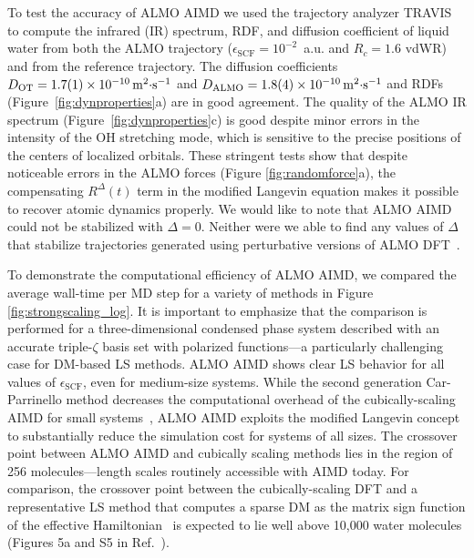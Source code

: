 \documentclass[aip,jcp,reprint,amsmath,amssymb]{revtex4-1}
\begin{document}
To test the accuracy of ALMO AIMD we used the trajectory analyzer TRAVIS~\cite{a:travis-main} to compute the infrared (IR) spectrum, RDF, and diffusion coefficient of liquid water from both the ALMO trajectory ($\epsilon_{\text{SCF}} = 10^{-2}$~a.u. and $R_{c} = 1.6$ vdWR) and from the reference trajectory. 
The diffusion coefficients $D_{\text{OT}}=\SI{1.7\pm0.1E-10}{\m^{2}\cdot\s^{-1}}$ and $D_{\text{ALMO}}=\SI{1.8\pm0.4E-10}{\m^{2}\cdot\s^{-1}}$ and RDFs (Figure~\ref{fig:dynproperties}a) are in good agreement. The quality of the ALMO IR spectrum (Figure~\ref{fig:dynproperties}c) is good despite minor errors in the intensity of the OH stretching mode, which is sensitive to the precise positions of the centers of localized orbitals. These stringent tests show that despite noticeable errors in the ALMO forces (Figure \ref{fig:randomforce}a), the compensating $R^{\Delta}(t)$ term in the modified Langevin equation makes it possible to recover atomic dynamics properly. We would like to note that ALMO AIMD could not be stabilized with $\Delta=0$. Neither were we able to find any values of $\Delta$ that stabilize trajectories generated using perturbative versions of ALMO DFT~\cite{a:almo-ls}.



To demonstrate the computational efficiency of ALMO AIMD, we compared the average wall-time per MD step for a variety of methods in Figure \ref{fig:strongscaling_log}.
It is important to emphasize that the comparison is performed for a three-dimensional condensed phase system described with an accurate triple-$\zeta$ basis set with polarized functions---a particularly challenging case for DM-based LS methods.
ALMO AIMD shows clear LS behavior for all values of $\epsilon_{\text{SCF}}$, even for medium-size systems. While the second generation Car-Parrinello method decreases the computational overhead of the cubically-scaling AIMD for small systems~\cite{a:2ndcpmd}, ALMO AIMD exploits the modified Langevin concept to substantially reduce the simulation cost for systems of all sizes.
The crossover point between ALMO AIMD and cubically scaling methods lies in the region of 256 molecules---length scales routinely accessible with AIMD today. For comparison, the crossover point between the cubically-scaling DFT and a representative LS method that computes a sparse DM as the matrix sign function of the effective Hamiltonian~\cite{a:ls-dm-sign} is expected to lie well above 10,000 water molecules (Figures 5a and S5 in Ref.~).
\end{document}
